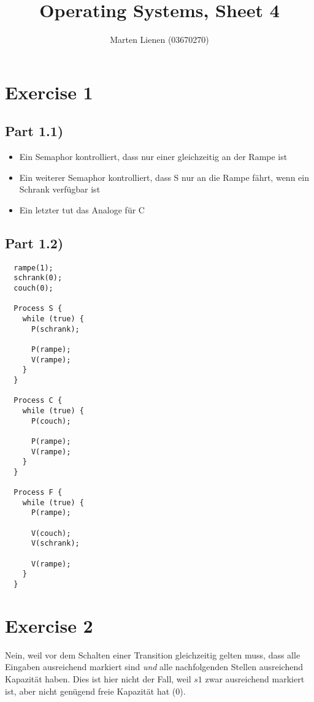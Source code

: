 \documentclass[10pt,a4paper]{article}
\title{Operating Systems, Sheet 4}
\author{Marten Lienen (03670270)}
\begin{document}
\maketitle

\section*{Exercise 1}

\subsection*{Part 1.1)}

\begin{itemize}
\item Ein Semaphor kontrolliert, dass nur einer gleichzeitig an der Rampe ist
\item Ein weiterer Semaphor kontrolliert, dass S nur an die Rampe fährt, wenn ein Schrank verfügbar ist
\item Ein letzter tut das Analoge für C
\end{itemize}

\subsection*{Part 1.2)}

\begin{verbatim}
  rampe(1);
  schrank(0);
  couch(0);

  Process S {
    while (true) {
      P(schrank);

      P(rampe);
      V(rampe);
    }
  }

  Process C {
    while (true) {
      P(couch);

      P(rampe);
      V(rampe);
    }
  }

  Process F {
    while (true) {
      P(rampe);

      V(couch);
      V(schrank);

      V(rampe);
    }
  }
\end{verbatim}

\section*{Exercise 2}

Nein, weil vor dem Schalten einer Transition gleichzeitig gelten muss, dass alle Eingaben ausreichend markiert sind \emph{und} alle nachfolgenden Stellen ausreichend Kapazität haben.
Dies ist hier nicht der Fall, weil $s1$ zwar ausreichend markiert ist, aber nicht genügend freie Kapazität hat ($0$).
\end{document}
